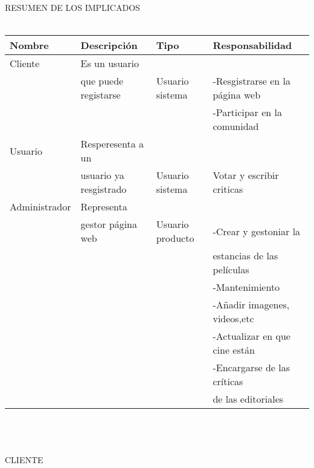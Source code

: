 \documentclass{article}
\begin{document}
RESUMEN DE LOS IMPLICADOS
\\ \\
\begin{tabular}{||l | l | l | l ||}
\hline
\hline
Nombre & Descripción & Tipo & Responsabilidad\\
\hline
Cliente & Es un usuario \\& que puede registarse & Usuario sistema &  -Resgistrarse en la página web \\&&& -Participar en la comunidad \\
\hline
Usuario & Resperesenta a un\\& usuario ya resgistrado & Usuario sistema & Votar y escribir criticas\\
\hline
Administrador & Representa \\&gestor página web & Usuario producto & -Crear y gestoniar la \\&&&estancias de las películas \\&&& -Mantenimiento \\&&& -Añadir imagenes, videos,etc \\&&& -Actualizar en que cine están \\&&& -Encargarse de las críticas \\&&&de las editoriales\\  
\hline
\hline
\end{tabular}
\\ \\ \\ 
CLIENTE
\\ \\
\end{document}
